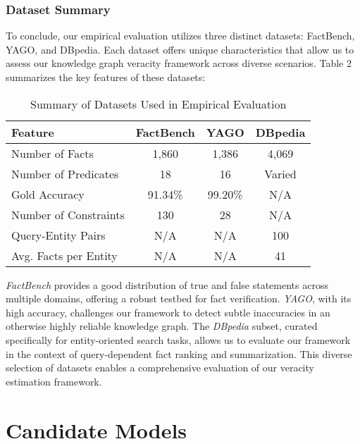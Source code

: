 \subsubsection{Dataset Summary}\label{subsubsec:empirical-evaluation:dataset-analysis:dbpedia:summary}
To conclude, our empirical evaluation utilizes three distinct datasets: FactBench, YAGO, and DBpedia. Each dataset offers unique characteristics that allow us to assess our knowledge graph veracity framework across diverse scenarios. Table 2 summarizes the key features of these datasets:

\begin{table}[h!]
    \centering
    \begin{tabular}{lccc}
        \toprule
        \textbf{Feature} & \textbf{FactBench} & \textbf{YAGO} & \textbf{DBpedia} \\
        \midrule
        Number of Facts & 1,860 & 1,386 & 4,069 \\
        Number of Predicates & 18 & 16 & Varied \\
        Gold Accuracy & 91.34\% & 99.20\% & N/A \\
        Number of Constraints & 130 & 28 & N/A \\
        Query-Entity Pairs & N/A & N/A & 100 \\
        Avg. Facts per Entity & N/A & N/A & 41 \\
        \bottomrule
    \end{tabular}
    \caption{Summary of Datasets Used in Empirical Evaluation}
    \label{tab:dataset-summary}
\end{table}

\textit{FactBench} provides a good distribution of true and false statements across multiple domains, offering a robust testbed for fact verification.
\textit{YAGO}, with its high accuracy, challenges our framework to detect subtle inaccuracies in an otherwise highly reliable knowledge graph.
The \textit{DBpedia} subset, curated specifically for entity-oriented search tasks, allows us to evaluate our framework in the context of query-dependent fact ranking and summarization.
This diverse selection of datasets enables a comprehensive evaluation of our veracity estimation framework.

\section{Candidate Models}\label{sec:empirical-evaluation:candidate-models}

